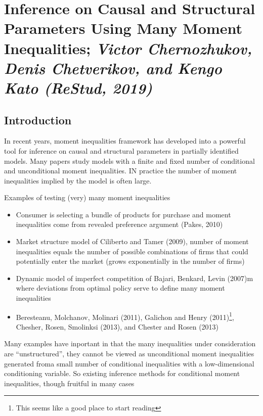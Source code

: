 

\section{Inference on Causal and Structural Parameters Using Many Moment Inequalities; \textit{\small Victor Chernozhukov, Denis Chetverikov, and Kengo Kato (ReStud, 2019)}}\label{sec:CCK-2019}

\subsection{Introduction}

In recent years, moment inequalities framework has developed into a powerful tool for inference on causal and structural parameters in partially identified models. Many papers study models with a finite and fixed number of conditional and unconditional moment inequalities. IN practice the number of moment inequalities implied by the model is often large. 

Examples of testing (very) many moment inequalities
\begin{itemize}
	\item Consumer is selecting a bundle of products for purchase and moment inequalities come from revealed preference argument (Pakes, 2010)
	\item Market structure model of Ciliberto and Tamer (2009), number of moment inequalities equals the number of possible combinations of firms that could potentially enter the market (grows exponentially in the number of firms)
	\item Dynamic model of imperfect competition of Bajari, Benkard, Levin (2007)m where deviations from optimal policy serve to define many moment inequalities
	\item Beresteanu, Molchanov, Molinari (2011), Galichon and Henry (2011)\footnote{This seems like a good place to start reading}, Chesher, Rosen, Smolinksi (2013), and Chester and Rosen (2013)
\end{itemize}
Many examples have inportant in that the many inequalities under consideration are ``unstructured'', they cannot be viewed as unconditional moment inequalities generated froma small number of conditional inequalities with a low-dimensional conditioning variable. So existing inference methods for conditional moment inequalities, though fruitful in many cases 

